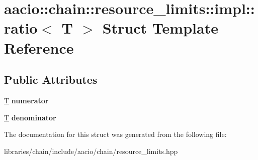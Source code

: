 \hypertarget{structaacio_1_1chain_1_1resource__limits_1_1impl_1_1ratio}{}\section{aacio\+:\+:chain\+:\+:resource\+\_\+limits\+:\+:impl\+:\+:ratio$<$ T $>$ Struct Template Reference}
\label{structaacio_1_1chain_1_1resource__limits_1_1impl_1_1ratio}
\subsection*{Public Attributes}
\begin{DoxyCompactItemize}
\item 
\mbox{\label{structaacio_1_1chain_1_1resource__limits_1_1impl_1_1ratio_acb2038b0e6726baa40f7b30816d96e80}} 
\mbox{\hyperlink{struct_t}{T}} {\bfseries numerator}
\item 
\mbox{\label{structaacio_1_1chain_1_1resource__limits_1_1impl_1_1ratio_ac00490d4d95cd1925c8507a0d7f8089c}} 
\mbox{\hyperlink{struct_t}{T}} {\bfseries denominator}
\end{DoxyCompactItemize}


The documentation for this struct was generated from the following file\+:\begin{DoxyCompactItemize}
\item 
libraries/chain/include/aacio/chain/resource\+\_\+limits.\+hpp\end{DoxyCompactItemize}

